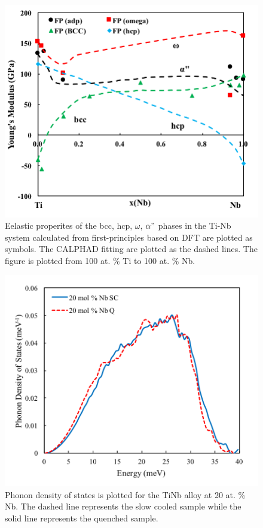 \pagebreak
\begin{figure}[H]
	\centering
	\includegraphics[width=\textwidth]{Chapter-7/Figures/tinbelastic.png}
	\caption{Eelastic properites of the bcc, hcp, $\omega$, $\alpha"$ phases in the Ti-Nb system calculated from first-principles based on DFT are plotted as symbols. The CALPHAD fitting are plotted as the dashed lines. The figure is plotted from 100 at. \% Ti to 100 at. \% Nb.}
	\label{Ch7-figure:tinbelastic}
\end{figure}

\pagebreak
\begin{figure}[H]
	\centering
	\includegraphics[width=\textwidth]{Chapter-7/Figures/50dos20.png}
	\caption{Phonon density of states is plotted for the TiNb alloy at 20 at. \% Nb. The dashed line represents the slow cooled sample while the solid line represents the quenched sample.}
	\label{Ch7-figure:50dos20}
\end{figure}

